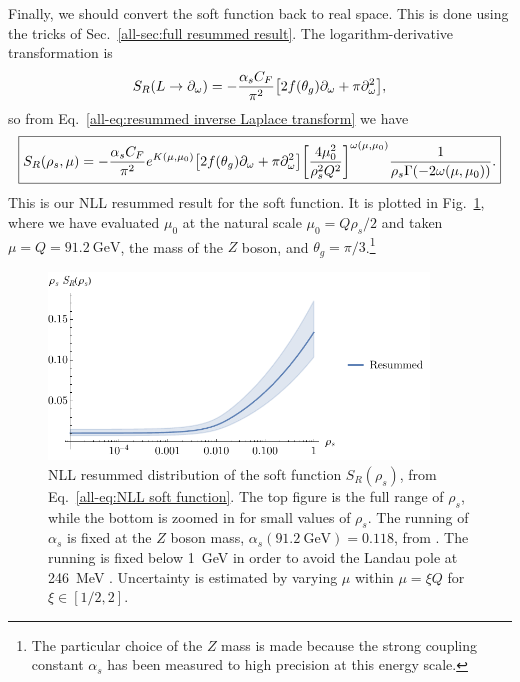 \documentclass[../thesis.tex]{subfiles}
\begin{document}
	Finally, we should convert the soft function back to real space. This is done using the tricks of Sec.~\ref{all-sec:full resummed result}. The logarithm-derivative transformation is
	\begin{equation}
		S_R(L \to \partial_{\omega}) = -\frac{\alpha_s C_F}{\pi^2}\qty[2f(\theta_g) \partial_{\omega} + \pi \partial^2_{\omega}],
	\end{equation}
	so from Eq.~\ref{all-eq:resummed inverse Laplace transform} we have
	\begin{equation}\label{all-eq:NLL soft function}
	\boxed{
		S_R(\rho_s, \mu) = -\frac{\alpha_s C_F}{\pi^2} e^{K(\mu, \mu_0)} \qty[2f(\theta_g) \partial_{\omega} + \pi \partial^2_{\omega}] \qty[\frac{4\mu_0^2}{\rho_s^2 Q^2}]^{\omega(\mu, \mu_0)} \frac{1}{\rho_s \Gamma(-2\omega(\mu, \mu_0))}.
	}
	\end{equation}
	This is our NLL resummed result for the soft function. It is plotted in Fig.~\ref{all-fig:resummed result}, where we have evaluated $\mu_0$ at the natural scale $\mu_0 = Q\rho_s / 2$ and taken $\mu = Q = \SI{91.2}{\giga\electronvolt}$, the mass of the $Z$ boson, and $\theta_g = \pi/3$.\footnote{The particular choice of the $Z$ mass is made because the strong coupling constant $\alpha_s$ has been measured to high precision at this energy scale.}

	\begin{figure}
	\begin{center}
		\includegraphics[width=0.9\textwidth]{figures/resummation_plot.pdf}

		\caption{\label{all-fig:resummed result}NLL resummed distribution of the soft function $S_R(\rho_s)$, from Eq.~\ref{all-eq:NLL soft function}. The top figure is the full range of $\rho_s$, while the bottom is zoomed in for small values of $\rho_s$. The running of $\alpha_s$ is fixed at the $Z$ boson mass, $\alpha_s(\SI{91.2}{\giga\electronvolt}) = 0.118$, from \cite{particle_data_group_review_2020}. The running is fixed below \SI{1}{\giga\electronvolt} in order to avoid the Landau pole at \SI{246}{\mega\electronvolt} \cite{larkoski_elementary_2019-1}. Uncertainty is estimated by varying $\mu$ within $\mu = \xi Q$ for $\xi \in [1/2, 2]$.}
	\end{center}
	\end{figure}
\end{document}

